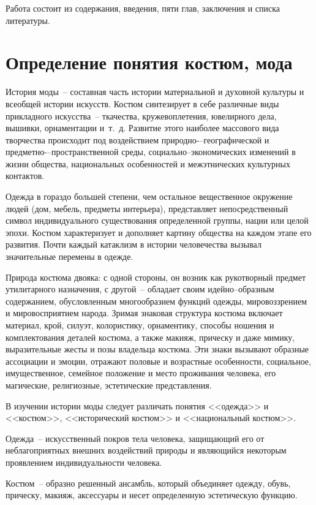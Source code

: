   Работа состоит из содержания, введения, пяти глав, заключения и списка литературы.
  
  \section{Определение понятия костюм, мода}
    
  История моды~-- составная часть истории материальной и духовной культуры и
  всеобщей истории искусств. Костюм синтезирует в себе различные виды
  прикладного искусства~-- ткачества, кружевоплетения, ювелирного дела,
  вышивки, орнаментации и~т.~д. Развитие этого наиболее массового вида
  творчества происходит под воздействием природно-–географической и
  предметно-–пространственной среды, социально--экономических изменений в
  жизни общества, национальных особенностей и межэтнических культурных
  контактов.

  Одежда в гораздо большей степени, чем остальное вещественное окружение людей
  (дом, мебель, предметы интерьера), представляет непосредственный символ
  индивидуального существования определенной группы, нации или целой эпохи.
  Костюм характеризует и дополняет картину общества на каждом этапе его
  развития. Почти каждый катаклизм в истории человечества вызывал значительные
  перемены в одежде.
  
  Природа костюма двояка: с одной стороны, он возник как рукотворный предмет
  утилитарного назначения, с другой~-- обладает своим идейно--образным
  содержанием, обусловленным многообразием функций одежды, мировоззрением и
  мировосприятием народа. Зримая знаковая структура костюма включает материал,
  крой, силуэт, колористику, орнаментику, способы ношения и комплектования
  деталей костюма, а также макияж, прическу и даже мимику, выразительные жесты
  и позы владельца костюма. Эти знаки вызывают образные ассоциации и эмоции,
  отражают половые и возрастные особенности, социальное, имущественное,
  семейное положение и место проживания человека, его магические, религиозные,
  эстетические представления.
 
  В изучении истории моды следует различать понятия <<одежда>> и <<костюм>>,
  <<исторический костюм>> и <<национальный костюм>>.
  
  Одежда~-- искусственный покров тела человека, защищающий его от
  неблагоприятных внешних воздействий природы и являющийся некоторым
  проявлением индивидуальности человека.
  
  Костюм~-- образно решенный ансамбль, который объединяет одежду, обувь,
  прическу, макияж, аксессуары и несет определенную эстетическую функцию.
  
